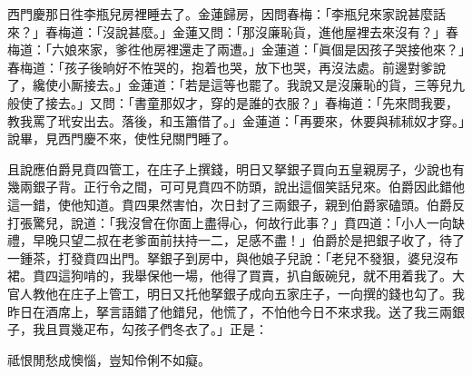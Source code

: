 西門慶那日徃李瓶兒房裡睡去了。金蓮歸房，因問春梅：「李瓶兒來家說甚麼話來？」春梅道：「沒說甚麼。」金蓮又問：「那沒廉恥貨，進他屋裡去來沒有？」春梅道：「六娘來家，爹徃他房裡還走了兩遭。」金蓮道：「眞個是因孩子哭接他來？」春梅道：「孩子後晌好不恠哭的，抱着也哭，放下也哭，再沒法處。前邊對爹說了，纔使小厮接去。」金蓮道：「若是這等也罷了。我說又是沒廉恥的貨，三等兒九般使了接去。」又問：「書童那奴才，穿的是誰的衣服？」春梅道：「先來問我要，教我罵了玳安出去。落後，和玉簫借了。」金蓮道：「再要來，休要與秫秫奴才穿。」說畢，見西門慶不來，使性兒關門睡了。

且說應伯爵見賁四管工，在庄子上撰錢，明日又拏銀子買向五皇親房子，少說也有幾兩銀子背。正行令之間，可可見賁四不防頭，說出這個笑話兒來。伯爵因此錯他這一錯，使他知道。賁四果然害怕，次日封了三兩銀子，親到伯爵家磕頭。伯爵反打張驚兒，說道：「我沒曾在你面上盡得心，何故行此事？」賁四道：「小人一向缺禮，早晚只望二叔在老爹面前扶持一二，足感不盡！」伯爵於是把銀子收了，待了一鍾茶，打發賁四出門。拏銀子到房中，與他娘子兒說：「老兒不發狠，婆兒沒布裙。賁四這狗啃的，我舉保他一場，他得了買賣，扒自飯碗兒，就不用着我了。大官人教他在庄子上管工，明日又托他拏銀子成向五家庄子，一向撰的錢也勾了。我昨日在酒席上，拏言語錯了他錯兒，他慌了，不怕他今日不來求我。送了我三兩銀子，我且買幾疋布，勾孩子們冬衣了。」正是：

\begin{myquote} 
祗恨閒愁成懊惱，豈知伶俐不如癡。
\end{myquote} 

